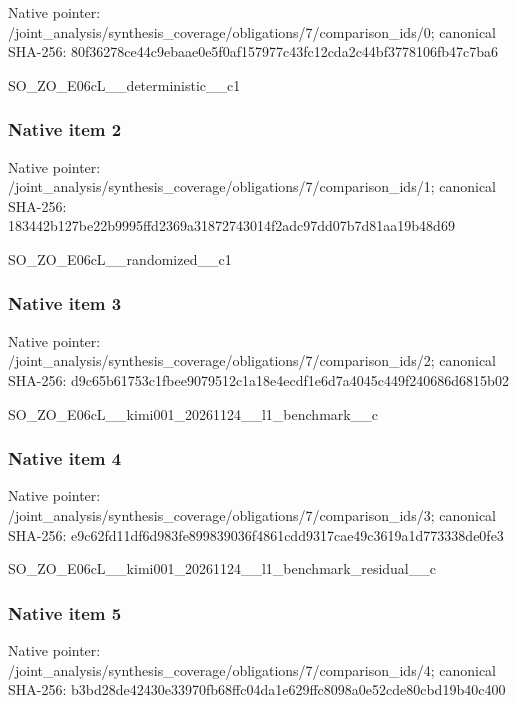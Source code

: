 \documentclass[10pt,a4paper]{article}
\begin{document}
Native pointer: /joint\_analysis/synthesi\allowbreak{}s\_coverage/obligations/7\allowbreak{}/comparison\_ids/0; canonical SHA-256: 80f36278ce44c9ebaae0e5f0\allowbreak{}af157977c43fc12cda2c44bf\allowbreak{}3778106fb47c7ba6


SO\_ZO\_E06cL\_\_deterministic\_\_c1


\subsubsection{Native item 2}


Native pointer: /joint\_analysis/synthesi\allowbreak{}s\_coverage/obligations/7\allowbreak{}/comparison\_ids/1; canonical SHA-256: 183442b127be22b9995ffd23\allowbreak{}69a31872743014f2adc97dd0\allowbreak{}7b7d81aa19b48d69


SO\_ZO\_E06cL\_\_randomized\_\_c1


\subsubsection{Native item 3}


Native pointer: /joint\_analysis/synthesi\allowbreak{}s\_coverage/obligations/7\allowbreak{}/comparison\_ids/2; canonical SHA-256: d9c65b61753c1fbee9079512\allowbreak{}c1a18e4ecdf1e6d7a4045c44\allowbreak{}9f240686d6815b02


SO\_ZO\_E06cL\_\_kimi001\_202\allowbreak{}61124\_\_l1\_benchmark\_\_c


\subsubsection{Native item 4}


Native pointer: /joint\_analysis/synthesi\allowbreak{}s\_coverage/obligations/7\allowbreak{}/comparison\_ids/3; canonical SHA-256: e9c62fd11df6d983fe899839\allowbreak{}036f4861cdd9317cae49c361\allowbreak{}9a1d773338de0fe3


SO\_ZO\_E06cL\_\_kimi001\_202\allowbreak{}61124\_\_l1\_benchmark\_resi\allowbreak{}dual\_\_c


\subsubsection{Native item 5}


Native pointer: /joint\_analysis/synthesi\allowbreak{}s\_coverage/obligations/7\allowbreak{}/comparison\_ids/4; canonical SHA-256: b3bd28de42430e33970fb68f\allowbreak{}fc04da1e629ffc8098a0e52c\allowbreak{}de80cbd19b40c400
\end{document}
